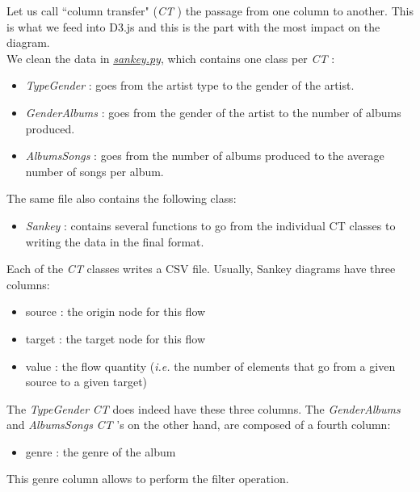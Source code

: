 \documentclass[a4paper, 11pt, oneside]{article}
\newcommand{\ie}{\textit{i.e. }}
\newcommand{\tg}{\textit{TypeGender }}
\newcommand{\ga}{\textit{GenderAlbums }}
\newcommand{\as}{\textit{AlbumsSongs }}
\newcommand{\sk}{\textit{Sankey }}
\newcommand{\ct}{\textit{CT }}
\begin{document}
Let us call ``column transfer" (\ct) the passage from one column to another. This is what we feed into D3.js and this is the part with the most impact on the diagram. \\
We clean the data in \href{https://github.com/jorislimonier/collab-viz/blob/main/joris/src/sankey.py}{\textit{sankey.py}}, which contains one class per \ct:
\begin{itemize}
    \item \tg : goes from the artist type to the gender of the artist.
    \item \ga : goes from the gender of the artist to the number of albums produced.
    \item \as : goes from the number of albums produced to the average number of songs per album.
\end{itemize}
The same file also contains the following class:
\begin{itemize}
    \item \sk : contains several functions to go from the individual CT classes to writing the data in the final format.
\end{itemize}

Each of the \ct classes writes a CSV file. Usually, Sankey diagrams have three columns:
\begin{itemize}
    \item source : the origin node for this flow
    \item target : the target node for this flow
    \item value : the flow quantity (\ie the number of elements that go from a given source to a given target)
\end{itemize}
The \tg \ct does indeed have these three columns. The \ga and \as \ct's on the other hand, are composed of a fourth column:
\begin{itemize}
    \item genre : the genre of the album
\end{itemize}
This genre column allows to perform the filter operation.
\end{document}
